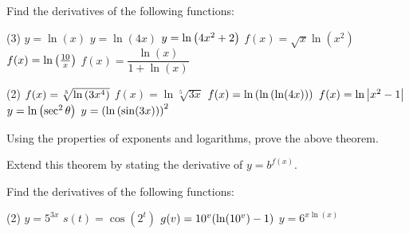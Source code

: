 \documentclass[answers]{exam}
\begin{document}
  \begin{ex*}
    Find the derivatives of the following functions:
  \end{ex*}
  \begin{tasks}[after-item-skip=\stretch{1}, label=~](3)
    \task $y=\ln(x)$
    \task $y=\ln(4x)$
    \task $y=\ln{\left(4x^2+2\right)}$
    \task $f(x)=\sqrt x\ln(x^2)$
    \task $f(x)=\ln{\left(\frac{10}{x}\right)}$
    \task $f(x)=\dfrac{\ln(x)}{1+\ln(x)}$
  \end{tasks}
  \vfill
  
  \pagebreak
  \begin{tasks}[after-item-skip=\stretch{1}, label=~](2)
    \task $f(x)=\sqrt[5]{\ln{\left(3x^4\right)}}$
    \task $f(x)=\ln\sqrt[5]{3x}$
    \task $f(x)=\ln{\left(\ln{\left(\ln(4x)\right)}\right)}$
    \task $f(x)=\ln{\left\vert x^2-1\right\vert}$
    \task $y=\ln{\left(\sec^2\theta\right)}$
    \task $y={\left(\ln{\left(\sin(3x)\right)}\right)}^2$
  \end{tasks}
  \vfill 
  \pagebreak
  
  \noindent
  \begin{ex*}
    Using the properties of exponents and logarithms, prove the above theorem. 
    
    \noindent
    Extend this theorem by stating the derivative of $y=b^{f(x)}$.
  \end{ex*}
  \vfill
  
  \begin{ex*}
    Find the derivatives of the following functions:
  \end{ex*}
  \begin{tasks}[after-item-skip=\stretch{1}, label=~](2)
    \task $y=5^{3x}$
    \task $s(t)=\cos(2^t)$
    \task $g(v)=10^v{\left(\ln(10^v)-1\right)}$
    \task $y=6^{x\ln(x)}$
  \end{tasks}
  \vfill 
  
  \pagebreak
  
  \noindent
\end{document}
